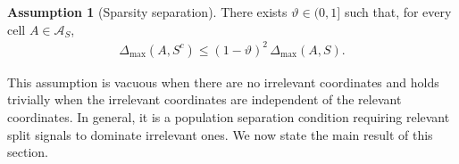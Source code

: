 \documentclass[11pt]{article}
\theoremstyle{plain}
\theoremstyle{definition}
\newtheorem{assumption}[theorem]{Assumption}
\theoremstyle{remark}
\theoremstyle{plain}
\newcommand{\bx}{\mathbf{x}}
\newcommand{\bX}{\mathbf{X}}
\newcommand{\1}{\mathbbm{1}}
\begin{document}
\begin{assumption}[Sparsity separation]
\label{assum:sparse-routing}
There exists $\vartheta\in(0,1]$ such that, for every cell $A\in\mathcal A_S$,
\begin{align}
\label{eq:sparse-routing}
\Delta_{\max}(A,S^c)
\le
(1-\vartheta)^2\,\Delta_{\max}(A,S).
\end{align}
\end{assumption}

This assumption is vacuous when there are no irrelevant coordinates and holds trivially when the irrelevant coordinates are independent of the relevant coordinates. In general, it is a population separation condition requiring relevant split signals to dominate irrelevant ones.
We now state the main result of this section.



\end{document}
